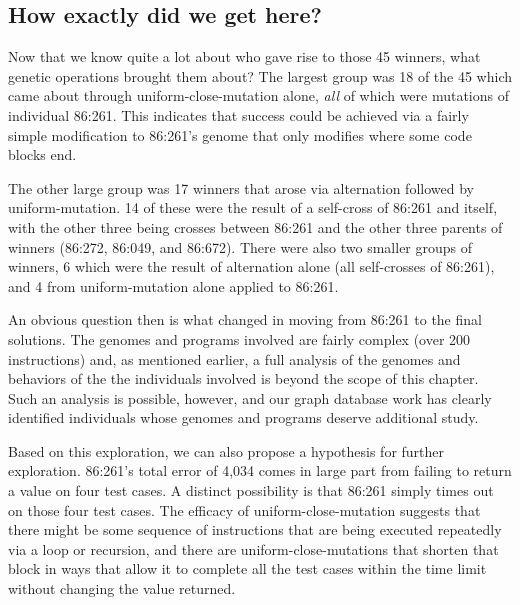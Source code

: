 \subsection{How exactly did we get here?}
\label{sec:howDidWeGetHere}

Now that we know quite a lot about who gave rise to those 45 winners, what genetic operations
brought them about? The largest group was 18 of the 45 which came about through 
uniform-close-mutation alone, \emph{all} of which were mutations of individual 86:261. This indicates
that success could be achieved via a fairly simple modification to 86:261's genome that only modifies 
where some code blocks end.

The other large group was 17 winners that arose via alternation followed by uniform-mutation. 14 of
these were the result of a self-cross of 86:261 and itself, with the other three being crosses between
86:261 and the other three parents of winners (86:272, 86:049, and 86:672). There were also two smaller
groups of winners, 6 which were the result of alternation alone (all self-crosses of 86:261), and 4
from uniform-mutation alone applied to 86:261.

An obvious question then is what changed in moving from 86:261 to the final solutions. The genomes and
programs involved are fairly complex (over 200 instructions) and, as mentioned earlier, 
a full analysis of the genomes and behaviors of the the individuals involved is 
beyond the scope of this chapter. Such an analysis is possible, however, and our graph database work has clearly
identified individuals whose genomes and programs deserve additional study. 

Based on this exploration, we can also propose a hypothesis for further exploration.
86:261's total error of 4,034 comes in large part from failing to return a value on four 
test cases. A distinct possibility is that 86:261 simply times out on those
four test cases. The efficacy of uniform-close-mutation suggests that there might be some sequence of 
instructions that are being executed repeatedly via a loop or recursion, and there are 
uniform-close-mutations that shorten that block in ways that allow it to complete all the test
cases within the time limit without changing the value returned.

